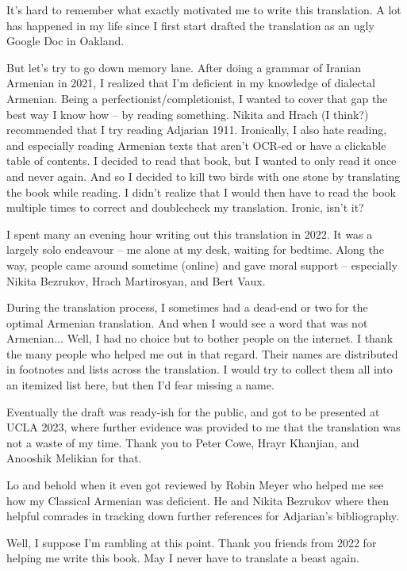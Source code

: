 \addchap{\lsAcknowledgementTitle} 
\largerpage
It's hard to remember what exactly motivated me to write this translation. A lot has happened in my life since I first start drafted the translation as an ugly Google Doc in Oakland. 

But let's try to go down memory lane. After doing a grammar of Iranian Armenian in 2021, I realized that I'm deficient in my knowledge of dialectal Armenian. Being a perfectionist/completionist, I wanted to cover that gap the best way I know how -- by reading something. Nikita and Hrach (I think?) recommended that I try reading Adjarian 1911. Ironically, I also hate reading, and especially reading Armenian texts that aren't OCR-ed or have a clickable table of contents. I decided to read that book, but I wanted to only read it once and never again. And so I decided to kill two birds with one stone by translating the book while reading. I didn't realize that I would then have to read the book multiple times to correct and doublecheck my translation. Ironic, isn't it? 


I spent many an evening hour writing out this translation in 2022. It was a largely solo endeavour -- me alone at my desk, waiting for bedtime. Along the way, people came around sometime (online) and gave moral support -- especially Nikita Bezrukov, Hrach Martirosyan, and Bert Vaux. 

During the translation process, I sometimes had a dead-end or two for the optimal Armenian translation. And when I would see a word that was not Armenian... Well, I had no choice but to bother people on the internet. I thank the many people who helped me out in that regard. Their names are distributed in footnotes and lists across the translation. I would try to collect them all into an itemized list here, but then I'd fear missing a name. 


Eventually the draft was ready-ish for the public, and got to be presented at UCLA 2023, where further evidence was provided to me that the translation was not a waste of my time. Thank you to Peter Cowe, Hrayr Khanjian, and Anooshik Melikian for that. 

Lo and behold when it even got reviewed by Robin Meyer who helped me see how my Classical Armenian was deficient. He and Nikita Bezrukov where then helpful comrades in tracking down further references for Adjarian's bibliography.


Well, I suppose I'm rambling at this point. Thank you friends from 2022 for helping me write this book. May I never have to translate a beast again. 
